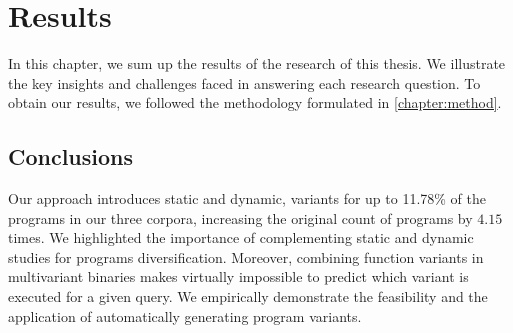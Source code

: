 \chapter{Results} 

In this chapter, we sum up the results of the research of this thesis.  We illustrate the key insights and challenges faced in answering each research question.  To obtain our results, we followed the methodology formulated in \autoref{chapter:method}.







\section*{Conclusions}

Our approach introduces static and dynamic, variants for up to 11.78\% of the programs in our three corpora, increasing the original count of programs by $4.15$ times. We highlighted the importance of complementing static and dynamic studies for programs diversification. Moreover, combining function variants in multivariant binaries makes virtually impossible to predict which variant is executed for a given query. We empirically demonstrate the feasibility and the application of automatically generating \wasm program variants.

